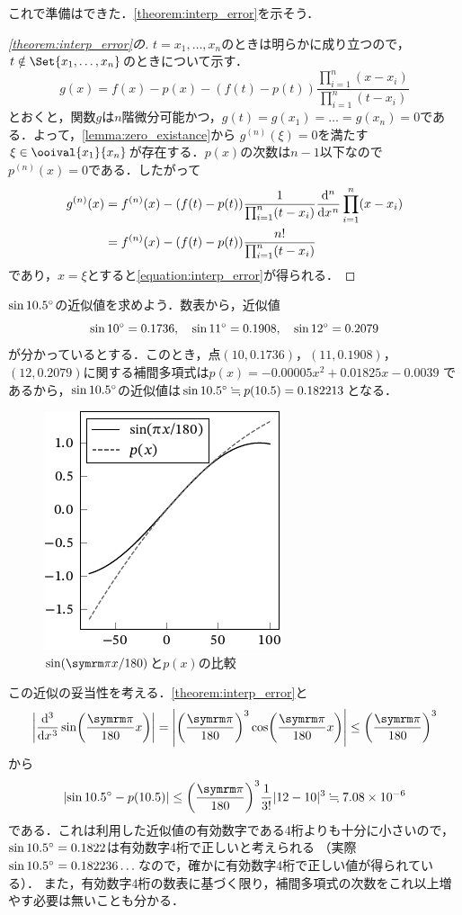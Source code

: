 \documentclass[../../main]{subfiles}
\begin{document}
これで準備はできた．\cref{theorem:interp_error}を示そう．

\begin{proof}[\cref{theorem:interp_error}の\proofname]
\(t=x_1,\dots,x_n\)のときは明らかに成り立つので，\(t\notin\Set{x_1,\dots,x_n}\)のときについて示す．
\[
  g(x) = f(x)-p(x)-(f(t)-p(t))\frac{\prod_{i=1}^n(x-x_i)}{\prod_{i=1}^n(t-x_i)}
\]
とおくと，関数\(g\)は\(n\)階微分可能かつ，\(g(t)=g(x_1)=\dots=g(x_n)=0\)である．よって，\cref{lemma:zero_existance}から
\(g^{(n)}(\xi)=0\)を満たす\(\xi\in\ooival{x_1}{x_n}\)が存在する．\(p(x)\)の次数は\(n-1\)以下なので\(p^{(n)}(x)=0\)である．したがって
\begin{align*}
  g^{(n)}(x) &= f^{(n)}(x)-(f(t)-p(t))\frac{1}{\prod_{i=1}^n(t-x_i)}\diff*[n]{\prod_{i=1}^n(x-x_i)}{x} \\
  &= f^{(n)}(x)-(f(t)-p(t))\frac{n!}{\prod_{i=1}^n(t-x_i)}
\end{align*}
であり，\(x=\xi\)とすると\cref{equation:interp_error}が得られる．
\end{proof}

\begin{example}
\(\sin10.5^{\mathord{\circ}}\)の近似値を求めよう．数表から，近似値
\[
  \sin10^{\mathord{\circ}} = 0.1736,
  \quad\sin11^{\mathord{\circ}} = 0.1908,
  \quad\sin12^{\mathord{\circ}} = 0.2079
\]
が分かっているとする．このとき，点\((10,0.1736)\)，\((11,0.1908)\)，\((12,0.2079)\)に関する補間多項式は\(p(x)=-0.00005x^2+0.01825x-0.0039\)
であるから，\(\sin10.5^{\mathord{\circ}}\)の近似値は\(\sin10.5^{\mathord{\circ}}\fallingdotseq p(10.5)=0.182213\)となる．

\begin{figure}[htbp]
  \centering
  \includegraphics{sin.pdf}
  \caption{\(\sin(\krez x/180)\)と\(p(x)\)の比較}
\end{figure}

この近似の妥当性を考える．\cref{theorem:interp_error}と
\[
  \abs*{\diff*[3]{\sin\pqty*{\frac{\krez}{180}x}}{x}} = \abs*{\pqty*{\frac{\krez}{180}}^3\cos\pqty*{\frac{\krez}{180}x}}
  \leq \pqty*{\frac{\krez}{180}}^3
\]
から
\[
  \abs*{\sin\degree{10.5}-p(10.5)} \leq \pqty*{\frac{\krez}{180}}^3\frac{1}{3!}\abs{12-10}^3
  \fallingdotseq 7.08\times 10^{-6}
\]
である．これは利用した近似値の有効数字である4桁よりも十分に小さいので，\(\sin10.5^{\mathord{\circ}}=0.1822\)は有効数字4桁で正しいと考えられる
（実際\(\sin10.5^{\mathord{\circ}}=0.182236\dots\)なので，確かに有効数字4桁で正しい値が得られている）．
また，有効数字4桁の数表に基づく限り，補間多項式の次数をこれ以上増やす必要は無いことも分かる．
\end{example}
\end{document}
